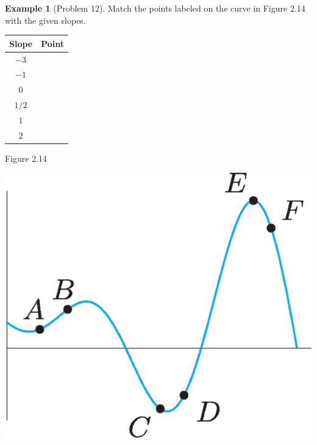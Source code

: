 \documentclass[oneside]{book}
\theoremstyle{definition}
\newtheorem{example}{Example}
\theoremstyle{solution}
\begin{document}
\begin{example}[Problem 12]
Match the points labeled on the curve in Figure 2.14 with the given slopes.
\begin{center}
\renewcommand{\arraystretch}{1.5}
\begin{tabular}{c|c}\hline
Slope &  Point \\ \hline
$-3$  &       \\ \hline
$-1$  &       \\ \hline
$0$   &       \\ \hline
$1/2$ &       \\ \hline
$1$   &       \\ \hline
$2$   &       \\ \hline
\end{tabular}
\bigskip

{\large Figure 2.14}

  \includegraphics[scale=0.75]{Images/s2-1prob12.pdf}
\end{center}
\end{example}
\end{document}
